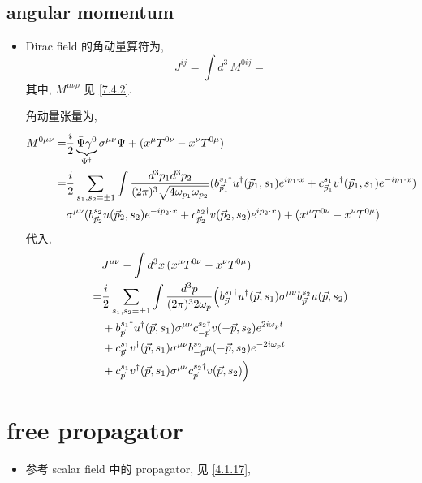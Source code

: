 \subsection{angular momentum}
\begin{itemize}
	\item Dirac field 的角动量算符为,
	\begin{equation}
		J^{i j} = \int d^3 \, M^{0 i j} =
	\end{equation}
	其中, $M^{\mu \nu \rho}$ 见 \eqref{7.4.2}.
	
	\begin{tcolorbox}[title=calculation:]
		角动量张量为,
		\begin{align}
			M^{0 \mu \nu} =& \frac{i}{2} \underbrace{\bar{\Psi} \gamma^0}_{\Psi^\dag} \sigma^{\mu \nu} \Psi + (x^\mu T^{0 \nu} - x^\nu T^{0 \mu}) \notag \\
			=& \frac{i}{2} \sum_{s_1, s_2 = \pm 1} \int \frac{d^3 p_1 d^3 p_2}{(2 \pi)^3 \sqrt{4 \omega_{p_1} \omega_{p_2}}} (b^{s_1 \dag}_{\vec{p}_1} u^\dag(\vec{p}_1, s_1) e^{i p_1 \cdot x} + c^{s_1}_{\vec{p}_1} v^\dag(\vec{p}_1, s_1) e^{- i p_1 \cdot x}) \notag \\
			& \sigma^{\mu \nu} (b^{s_2}_{\vec{p}_2} u(\vec{p}_2, s_2) e^{- i p_2 \cdot x} + c^{s_2 \dag}_{\vec{p}_2} v(\vec{p}_2, s_2) e^{i p_2 \cdot x}) + (x^\mu T^{0 \nu} - x^\nu T^{0 \mu})
		\end{align}
		代入,
		\begin{align}
			& J^{\mu \nu} - \int d^3 x \, (x^\mu T^{0 \nu} - x^\nu T^{0 \mu}) \notag \\
			=& \frac{i}{2} \sum_{s_1, s_2 = \pm 1} \int \frac{d^3 p}{(2 \pi)^3 2 \omega_p} \Big( b^{s_1 \dag}_{\vec{p}} u^\dag(\vec{p}, s_1) \sigma^{\mu \nu} b^{s_2}_{\vec{p}} u(\vec{p}, s_2) \notag \\
			& + b^{s_1 \dag}_{\vec{p}} u^\dag(\vec{p}, s_1) \sigma^{\mu \nu} c^{s_2 \dag}_{- \vec{p}} v(- \vec{p}, s_2) e^{2 i \omega_p t} \notag \\
			& + c^{s_1}_{\vec{p}} v^\dag(\vec{p}, s_1) \sigma^{\mu \nu} b^{s_2}_{- \vec{p}} u(- \vec{p}, s_2) e^{- 2 i \omega_p t} \notag \\
			& + c^{s_1}_{\vec{p}} v^\dag(\vec{p}, s_1) \sigma^{\mu \nu} c^{s_2 \dag}_{\vec{p}} v(\vec{p}, s_2) \Big)
		\end{align}
	\end{tcolorbox}
\end{itemize}

\section{free propagator}
\begin{itemize}
	\item 参考 scalar field 中的 propagator, 见 \eqref{4.1.17}, 
\end{itemize}

